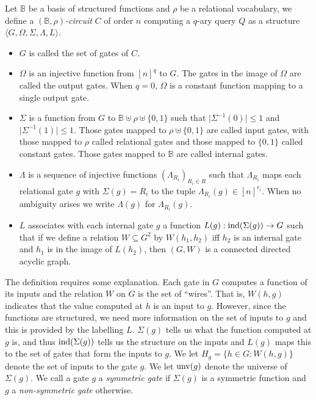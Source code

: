 \documentclass[a4paper,UKenglish]{lipics-v2018}
\begin{document}
\begin{definition}
  Let $\mathbb{B}$ be a basis of structured functions and $\rho$ be a relational
  vocabulary, we define a \emph{$(\mathbb{B}, \rho)$-circuit} $C$ of order $n$
  computing a $q$-ary query $Q$ as a structure $\langle G, \Omega, \Sigma,
  \Lambda, L \rangle$.
  \begin{itemize}
    \setlength\itemsep{0mm}
  \item $G$ is called the set of gates of
    $C$.%
  \item $\Omega$ is an injective function from $[n]^q$ to $G$. The gates in the
    image of $\Omega$ are called the output gates. When $q = 0$, $\Omega$ is a
    constant function mapping to a single output gate.
  \item $\Sigma$ is a function from $G$ to $\mathbb{B} \uplus \rho \uplus
    \{0,1\} $ such that $\vert \Sigma^{-1} (0) \vert \leq 1$ and $\vert
    \Sigma^{-1} (1) \vert \leq 1$. Those gates mapped to $\rho \uplus \{0,1\}$
    are called input gates, with those mapped to $\rho$ called relational gates
    and those mapped to $\{0,1\}$ called constant gates. Those gates mapped to
    $\mathbb{B}$ are called internal gates.
  \item $\Lambda$ is a sequence of injective functions $(\Lambda_{R_i})_{R_i \in
      R}$ such that $\Lambda_{R_i}$ maps each relational gate $g$ with $\Sigma
    (g) = R_i$ to the tuple $\Lambda_{R_i} (g) \in [n]^{r_i}$. When no ambiguity
    arises we write $\Lambda (g)$ for $\Lambda_{R_i} (g)$.
  \item $L$ associates with each internal gate $g$ a function $L(g):
    \text{\upshape ind}(\Sigma(g)) \rightarrow G$ such that if we define a relation $W
    \subseteq G^{2}$ by $W(h_1,h_2)$ iff $h_2$ is an internal gate and $h_1$ is
    in the image of $L(h_2)$, then $(G, W)$ is a connected directed acyclic
    graph.
  \end{itemize}
\end{definition}

The definition requires some explanation. Each gate in $G$ computes a function
of its inputs and the relation $W$ on $G$ is the set of ``wires''. That is,
$W(h,g)$ indicates that the value computed at $h$ is an input to $g$. However,
since the functions are structured, we need more information on the set of
inputs to $g$ and this is provided by the labelling $L$. $\Sigma(g)$ tells us
what the function computed at $g$ is, and thus $\text{\upshape ind}(\Sigma(g))$ tells us the
structure on the inputs and $L(g)$ maps this to the set of gates that form the
inputs to $g$. We let $H_g = \{h \in G : W(h,g)\}$ denote the set of inputs to
the gate $g$. We let $\text{unv}(g)$ denote the universe of $\Sigma(g)$. We call
a gate $g$ a \emph{symmetric gate} if $\Sigma(g)$ is a symmetric function and
$g$ a \emph{non-symmetric gate} otherwise.
\end{document}
